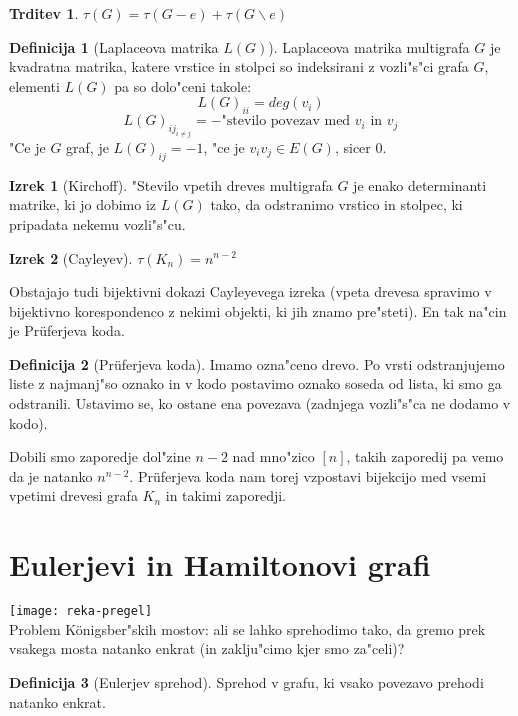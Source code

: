 \documentclass{article}
\theoremstyle{definition}
\newtheorem{definition}{Definicija}[section]
\newtheorem{claim}{Trditev}[section]
\newtheorem{theorem}{Izrek}[section]
\begin{document}
	\begin{claim}
		$\tau(G) = \tau(G-e) + \tau(G \backslash e)$
	\end{claim}
	
	\begin{definition}[Laplaceova matrika $L(G)$]
		Laplaceova matrika multigrafa $G$ je kvadratna matrika, katere vrstice in stolpci so indeksirani z vozli"s"ci grafa $G$, elementi $L(G)$ pa so dolo"ceni takole:
		$$ L(G)_{ii} = deg(v_i)$$
		$$ L(G)_{ij_{i \neq j}} = -\text{"stevilo povezav med }v_i\text{ in }v_j $$
		"Ce je $G$ graf, je $L(G)_{ij} = -1$, "ce je $v_iv_j \in E(G)$, sicer 0.
	\end{definition}

	\begin{theorem}[Kirchoff]
		"Stevilo vpetih dreves multigrafa $G$ je enako determinanti matrike, ki jo dobimo iz $L(G)$  tako, da odstranimo vrstico in stolpec, ki pripadata nekemu vozli"s"cu.
	\end{theorem} 

	\begin{theorem}[Cayleyev]
		$\tau(K_n) = n^{n-2}$
	\end{theorem}
	
	Obstajajo tudi bijektivni dokazi Cayleyevega izreka (vpeta drevesa spravimo v bijektivno korespondenco z nekimi objekti, ki jih znamo pre"steti). En tak na"cin je Pr\"uferjeva koda.
	\begin{definition}[Pr\"uferjeva koda]
		Imamo ozna"ceno drevo. Po vrsti odstranjujemo liste z najmanj"so oznako in v kodo postavimo oznako soseda od lista, ki smo ga odstranili. Ustavimo se, ko ostane ena povezava (zadnjega vozli"s"ca ne dodamo v kodo).
	\end{definition}
	Dobili smo zaporedje dol"zine $n-2$ nad mno"zico $[n]$, takih zaporedij pa vemo da je natanko $n^{n-2}$. Pr\"uferjeva koda nam torej vzpostavi bijekcijo med vsemi vpetimi drevesi grafa $K_n$ in takimi zaporedji.
	
	\section{Eulerjevi in Hamiltonovi grafi}
	\texttt{[image: reka-pregel]} \\
	Problem K\"onigsber"skih mostov: ali se lahko sprehodimo tako, da gremo prek vsakega mosta natanko enkrat (in zaklju"cimo kjer smo za"celi)?
	
	\begin{definition}[Eulerjev sprehod]
		Sprehod v grafu, ki vsako povezavo prehodi natanko enkrat.
	\end{definition}
	
\end{document}
